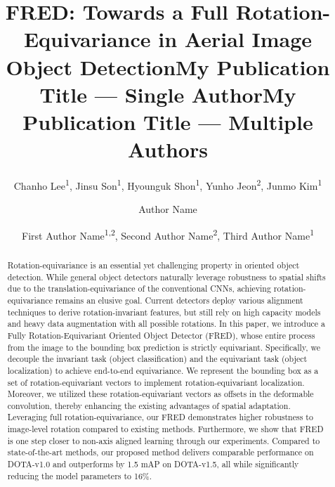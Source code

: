 \documentclass[letterpaper]{article} %
\title{FRED: Towards a Full Rotation-Equivariance in Aerial Image Object Detection}
\author{
    Chanho Lee\textsuperscript{\rm 1},
    Jinsu Son\textsuperscript{\rm 1},
    Hyounguk Shon\textsuperscript{\rm 1},
    Yunho Jeon\textsuperscript{\rm 2},
    Junmo Kim\textsuperscript{\rm 1}
}
\title{My Publication Title --- Single Author}
\author {
    Author Name
}
\title{My Publication Title --- Multiple Authors}
\author {
    First Author Name\textsuperscript{\rm 1,\rm 2},
    Second Author Name\textsuperscript{\rm 2},
    Third Author Name\textsuperscript{\rm 1}
}
\begin{document}
\maketitle
 

\begin{abstract}
Rotation-equivariance is an essential yet challenging property in oriented object detection. While general object detectors naturally leverage robustness to spatial shifts due to the translation-equivariance of the conventional CNNs, achieving rotation-equivariance remains an elusive goal. Current detectors deploy various alignment techniques to derive rotation-invariant features, but still rely on high capacity models and heavy data augmentation with all possible rotations. In this paper, we introduce a Fully Rotation-Equivariant Oriented Object Detector (FRED), whose entire process from the image to the bounding box prediction is strictly equivariant. Specifically, we decouple the invariant task (object classification) and the equivariant task (object localization) to achieve end-to-end equivariance. We represent the bounding box as a set of rotation-equivariant vectors to implement rotation-equivariant localization. Moreover, we utilized these rotation-equivariant vectors as offsets in the deformable convolution, thereby enhancing the existing advantages of spatial adaptation. Leveraging full rotation-equivariance, our FRED demonstrates higher robustness to image-level rotation compared to existing methods. Furthermore, we show that FRED is one step closer to non-axis aligned learning through our experiments. Compared to state-of-the-art methods, our proposed method delivers comparable performance on DOTA-v1.0 and outperforms by 1.5 mAP on DOTA-v1.5, all while significantly reducing the model parameters to 16\%.
\end{abstract}
\end{document}
